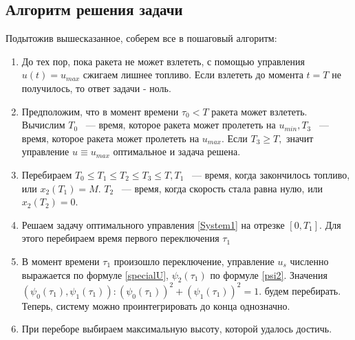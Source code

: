 \documentclass[10pt,pdf,hyperref={unicode}]{beamer}
\begin{document}
	\subsection{Алгоритм решения задачи}
		Подытожив вышесказанное, соберем все в пошаговый алгоритм:
		\begin{enumerate}
		\item До тех пор, пока ракета не может взлететь, с помощью управления $u(t) = u_{max}$ 
		сжигаем лишнее топливо. Если взлететь до момента $t = T$ не получилось, то ответ задачи - ноль.
		\item Предположим, что в момент времени $\tau_0 < T$ ракета может взлететь. Вычислим $T_0$ ~--- время, которое ракета может
		пролететь на $u_{min}, T_3$ ~--- время, которое ракета может пролететь на $u_{max}.$ Если $T_3 \ge T,$
		значит управление $u \equiv u_{max}$ оптимальное и задача решена.
		\item Перебираем $T_0 \le T_1 \le T_2 \le T_3 \le T, T_1$ ~--- время, когда закончилось топливо, или $x_2(T_1) = M.$
		$T_2$ ~--- время, когда скорость стала равна нулю, или $x_2(T_2) = 0.$ 
		\item Решаем задачу оптимального управления \eqref{System1} на отрезке $[0, T_1].$ 
		Для этого перебираем время первого переключения $\tau_1$ 
		\item В момент времени $\tau_1$ произошло переключение, управление $u_s$ численно выражается по формуле \eqref{specialU},
		$\psi_2(\tau_1)$ по формуле \eqref{psi2}. Значения $(\psi_0(\tau_1), \psi_1(\tau_1)) : (\psi_0(\tau_1)) ^ 2 + (\psi_1(\tau_1)) ^ 2 = 1.$
		будем перебирать. Теперь, систему можно проинтегрировать до конца однозначно.
		\item При переборе выбираем максимальную высоту, которой удалось достичь.
		\end{enumerate}
\end{document}
